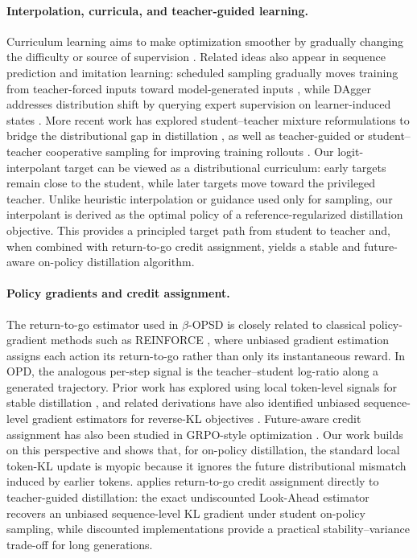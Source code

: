 \paragraph{Interpolation, curricula, and teacher-guided learning.}
Curriculum learning aims to make optimization smoother by gradually changing the
difficulty or source of supervision \citep{bengio2009curriculum}. Related ideas also
appear in sequence prediction and imitation learning: scheduled sampling gradually moves
training from teacher-forced inputs toward model-generated inputs
\citep{bengio2015scheduled}, while DAgger addresses distribution shift by querying expert
supervision on learner-induced states \citep{ross2011reduction}. More recent work has
explored student--teacher mixture reformulations to bridge the distributional gap in
distillation \citep{jang2026stable}, as well as teacher-guided or
student--teacher cooperative sampling for improving training rollouts
\citep{xu2025speculative,shenfeld2023tgrl}. Our logit-interpolant target can be viewed as
a distributional curriculum: early targets remain close to the student, while later targets
move toward the privileged teacher. Unlike heuristic interpolation or guidance used only
for sampling, our interpolant is derived as the optimal policy of a reference-regularized
distillation objective. This provides a principled target path from student to teacher and,
when combined with return-to-go credit assignment, yields a stable and future-aware
on-policy distillation algorithm.

\paragraph{Policy gradients and credit assignment.}
The return-to-go estimator used in $\beta$-OPSD is closely related to classical policy-gradient methods such as
REINFORCE \citep{williams1992simple}, where unbiased gradient estimation assigns each action its
return-to-go rather than only its instantaneous reward. In OPD, the analogous per-step
signal is the teacher--student log-ratio along a generated trajectory. Prior work has explored
using local token-level signals for stable distillation \citep{li2026rethinking, armandpour2026unmasking, shen2026anti, jang2026stable, kim2026does}, and related derivations have
also identified unbiased sequence-level gradient estimators for reverse-KL objectives
\citep{agrawal2026reinforcement, liu2026self}. Future-aware credit assignment has also been studied in GRPO-style optimization
\citep{schulman2015high, sutton1998reinforcement}. Our work builds on this perspective and shows that, for on-policy distillation, the
standard local token-KL update is myopic because it ignores the future distributional
mismatch induced by earlier tokens. \ours{} applies return-to-go credit assignment directly
to teacher-guided distillation: the exact undiscounted Look-Ahead estimator recovers an
unbiased sequence-level KL gradient under student on-policy sampling, while discounted
implementations provide a practical stability--variance trade-off for long generations.